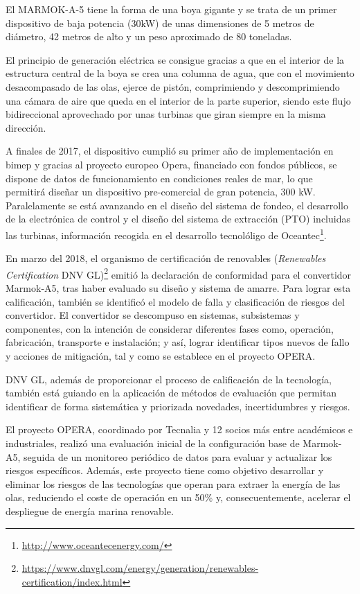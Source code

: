 \begin{itemize}
  El MARMOK-A-5 tiene la forma de una boya gigante y se trata de un
  primer dispositivo de baja potencia (30kW) de unas dimensiones de 5
  metros de diámetro, 42 metros de alto y un peso aproximado de 80
  toneladas.

  El principio de generación eléctrica se consigue gracias a que en el
  interior de la estructura central de la boya se crea una columna de
  agua, que con el movimiento desacompasado de las olas, ejerce de
  pistón, comprimiendo y descomprimiendo una cámara de aire que queda en
  el interior de la parte superior, siendo este flujo bidireccional
  aprovechado por unas turbinas que giran siempre en la misma dirección.

  A finales de 2017, el dispositivo
  cumplió
  su primer año de implementación en bimep \cite{marmok17} y gracias al proyecto europeo
  Opera, financiado con fondos públicos, se dispone de datos de
  funcionamiento en condiciones reales de mar, lo que permitirá diseñar
  un dispositivo pre-comercial de gran potencia, 300 kW. Paralelamente
  se está avanzando en el diseño del sistema de fondeo, el desarrollo de
  la electrónica de control y el diseño del sistema de extracción (PTO)
  incluidas las turbinas, información recogida en el desarrollo tecnolóligo de
  Oceantec\footnote{\url{http://www.oceantecenergy.com/}}.

  En marzo del 2018, el organismo de certificación de renovables (\emph{Renewables Certification} DNV GL)\footnote{\url{https://www.dnvgl.com/energy/generation/renewables-certification/index.html}} emitió la declaración de conformidad para el convertidor
  Marmok-A5, tras haber evaluado su diseño y sistema de amarre. Para
  lograr esta calificación, también se identificó el modelo de falla y
  clasificación de riesgos del convertidor. El convertidor se descompuso
  en sistemas, subsistemas y componentes, con la intención de considerar
  diferentes fases como, operación, fabricación, transporte e
  instalación; y así, lograr identificar tipos nuevos de fallo y
  acciones de mitigación, tal y como se establece en el proyecto OPERA.

  DNV GL, además de proporcionar el proceso de calificación de la
  tecnología, también está guiando en la aplicación de métodos de
  evaluación que permitan identificar de forma sistemática y priorizada
  novedades, incertidumbres y riesgos.

  El proyecto OPERA, coordinado por Tecnalia y 12 socios más entre
  académicos e industriales, realizó una evaluación inicial de la
  configuración base de Marmok-A5, seguida de un monitoreo periódico de
  datos para evaluar y actualizar los riesgos específicos. Además, este
  proyecto tiene como objetivo desarrollar y eliminar los riesgos
  de las tecnologías que operan para extraer la energía de las olas,
  reduciendo el coste de operación en un 50\% \cite{oceantec18} y, consecuentemente,
  acelerar el despliegue de energía marina renovable.



\end{itemize}
